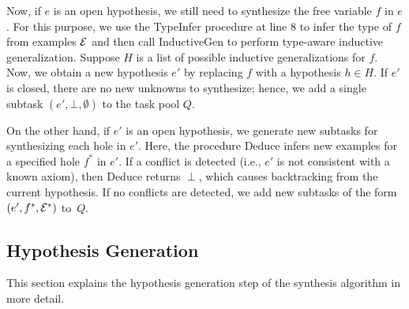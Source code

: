  Now, if $e$ is an open hypothesis, we still need to synthesize the free variable $f$ in $e$. 
 For this purpose, we use the {\sc TypeInfer} procedure at line 8 to infer 
 the type of $f$ from examples $\mathcal{E}$ and then call {\sc
   InductiveGen} to perform type-aware inductive generalization. %
  Suppose $H$ is a list of possible inductive generalizations for $f$. Now, we obtain a new hypothesis $e'$ by 
  replacing $f$ with a hypothesis $h \in H$. If $e'$ is closed, there are no new 
  unknowns to synthesize; hence, we add a single subtask $(e', \bot, \emptyset)$ to the task pool $Q$. 
  
  
  On the other hand, if $e'$ is  an open hypothesis, we generate new subtasks for synthesizing each hole in $e'$. Here, the procedure  {\sc Deduce} infers new examples for a specified hole $f^*$ in $e'$. 
  If a conflict is detected (i.e., $e'$ is not consistent with a known axiom), then {\sc Deduce} returns $\perp$, which
causes  backtracking from the current hypothesis. If no conflicts are detected, we add new subtasks of the form $(e', f^*, \mathcal{E}^*)$
to~$Q$.

\subsection{Hypothesis Generation}\label{sec:ind-gen}

This section explains the hypothesis generation step of the synthesis algorithm in more detail.


